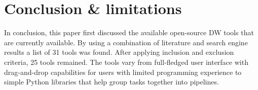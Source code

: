 \documentclass[11pt]{article}
\begin{document}

\section{Conclusion \& limitations}
In conclusion, this paper first discussed the available open-source DW tools that are currently available. By using a combination of literature and search engine results a list of 31 tools was found. After applying inclusion and exclusion criteria, 25 tools remained. The tools vary from full-fledged user interface with drag-and-drop capabilities for users with limited programming experience to simple Python libraries that help group tasks together into pipelines. \\
\end{document}
